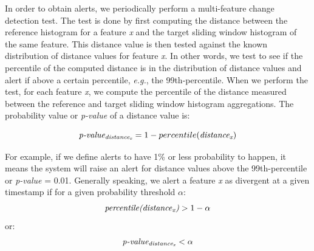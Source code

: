 In order to obtain alerts, we periodically perform a multi-feature change detection test. The test is done by first computing the distance between the reference histogram for a feature \textit{x} and the target sliding window histogram of the same feature. This distance value is then tested against the known distribution of distance values for feature \textit{x}. In other words, we test to see if the percentile of the computed distance is in the distribution of distance values and alert if above a certain percentile, \textit{e.g.}, the 99th-percentile. When we perform the test, for each feature \textit{x}, we compute the percentile of the distance measured between the reference and target sliding window histogram aggregations. The probability value or \textit{p-value} of a distance value is: 

\[\textit{p-value\textsubscript{distance\textsubscript{x}}} = 1 - percentile(\textit{distance\textsubscript{x}})\]

For example, if we define alerts to have 1\% or less probability to happen, it means the system will raise an alert for distance values above the 99th-percentile or \textit{p-value} = 0.01. Generally speaking, we alert a feature \textit{x} as divergent at a given timestamp if for a given probability threshold $\alpha$:
\[ \textit{percentile(distance\textsubscript{x})} > 1 - \alpha \]
or:
\begin{equation}
    \label{eq:alert-test}
    \textit{p-value\textsubscript{distance\textsubscript{x}}} < \alpha
\end{equation}

